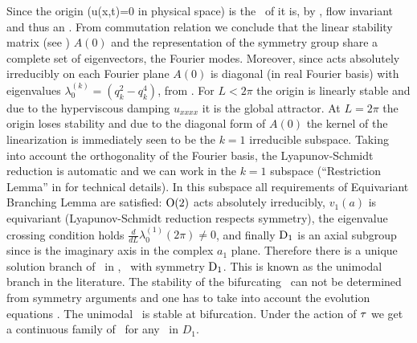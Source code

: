  Since the origin (u(x,t)=0 in physical space) is the \fixedsp\ of  it is,
by , flow invariant and thus
an \eqv. From commutation relation  we conclude that the
linear stability matrix (see ) $A(0)$
and the representation of the symmetry group  share a complete
set of eigenvectors, the Fourier modes.
Moreover, since  acts absolutely irreducibly
on each Fourier plane $A(0)$ is diagonal (in real Fourier basis)
with eigenvalues $\lambda_0^{(k)}=( q_k^2 - q_k^4 )$, from .
For $L<2\pi$
the origin is linearly stable and due to the hyperviscous damping $u_{xxxx}$ it is the global
attractor. At $L=2\pi$ the origin loses stability and due
to the diagonal form of $A(0)$ the kernel of the linearization is immediately seen to be the
$k=1$ irreducible subspace. Taking into account the orthogonality of the Fourier basis, the Lyapunov-Schmidt reduction \cite{golubitsky2002sp} is automatic and we can work in the $k=1$ subspace (\cf ``Restriction Lemma'' in 
for technical details). In this subspace all requirements
of Equivariant Branching Lemma \cite{golubitsky2002sp} are satisfied: $\mathrm{O}(2)$ acts
absolutely irreducibly, $v_1(a)$ is equivariant (Lyapunov-Schmidt reduction respects symmetry),
the eigenvalue crossing condition holds $\frac{d}{d L}\lambda_0^{(1)}(2\pi)\neq 0$, and
finally $\mathrm{D}_{1}$ is an axial subgroup since  is the imaginary axis in the complex $a_1$ plane.
Therefore there is a unique solution branch of \eqva\ in , \ie\ with symmetry $\mathrm{D}_{1}$.
This is known as the unimodal branch in the literature. The stability of the bifurcating \eqv\
can not be determined from symmetry arguments and one has to take into account the evolution equations
\refeq{expan}. The unimodal \eqv\ is stable at bifurcation\rf{KNSks90}. Under the action of $\tau$ we
get a continuous family of \eqva\ for any \eqv\ in $D_1$.

